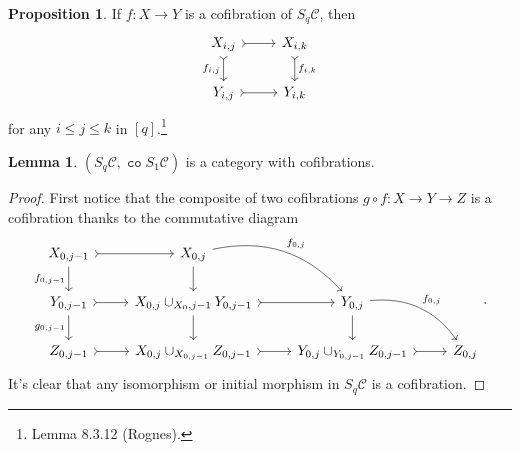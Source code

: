 \documentclass[10pt,letterpaper,cm]{nupset}
\theoremstyle{definition}
\theoremstyle{theorem}
\newtheorem{lemma}[definition]{Lemma}
\newtheorem{prop}[definition]{Proposition}
\theoremstyle{remark}
\newcommand{\1}{\mathbf{1}}
\renewcommand{\c}{\mathscr{C}}
\newcommand{\0}{\vec 0}
\DeclareMathOperator{\co}{\mathtt{co}}
\begin{document}
\begin{prop}
If $f: X \to Y$ is a cofibration of $S_q\c$, then 
\[
\begin{tikzcd}
{X_{i, j}} \arrow[d, "{f_{i,j}}"', tail] \arrow[r, tail] & {X_{i, k}} \arrow[d, "{f_{i,k}}", tail] \\
{Y_{i, j}} \arrow[r, tail] & {Y_{i,k}}
\end{tikzcd}
\] for any $i \leq j \leq k$ in $\left[q\right]$.\footnote{Lemma 8.3.12 (Rognes).}
\end{prop}

\begin{lemma}
$\left(S_q\c, \co{S_1} \c\right)$ is a category with cofibrations. 
\end{lemma}
\begin{proof}
First notice that the composite of two cofibrations $g \circ f : X \to Y \to Z$ is a cofibration thanks to the commutative diagram 
\[
\begin{tikzcd}
{X_{0, j-1}} \arrow[r, tail] \arrow[d, "{f_{0, j-1}}"'] & {X_{0, j}} \arrow[d] \arrow[rd, "{f_{0, j}}", bend left] &  &  \\
{Y_{0, j-1}} \arrow[d, "{g_{0, j-1}}"'] \arrow[r, tail] & {X_{0, j} \cup_{X_0, j-1} Y_{0, j-1}} \arrow[d] \arrow[r, tail] & {Y_{0, j}} \arrow[d] \arrow[rd, "{f_{0, j}}", bend left] &  \\
{Z_{0, j-1}} \arrow[r, tail] & {X_{0, j} \cup_{X_{0, j-1}} Z_{0, j-1}} \arrow[r, tail] & {Y_{0, j} \cup_{Y_{0, j-1}} Z_{0, j-1}} \arrow[r, tail] & {Z_{0, j}}
\end{tikzcd}.
\]
It's clear that any isomorphism or initial morphism in $S_q \c$ is a cofibration.



\end{proof}
\end{document}
